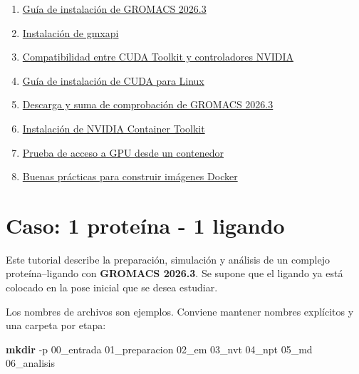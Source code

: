 \documentclass[
  spanish,
  11pt,
  a4paper]{article}
\newenvironment{Shaded}{\begin{snugshade}}{\end{snugshade}}
\newcommand{\AttributeTok}[1]{\textcolor[rgb]{0.13,0.29,0.53}{#1}}
\newcommand{\FunctionTok}[1]{\textcolor[rgb]{0.13,0.29,0.53}{\textbf{#1}}}
\newcommand{\NormalTok}[1]{#1}
\providecommand{\tightlist}{%
  \setlength{\itemsep}{0pt}\setlength{\parskip}{0pt}}
\begin{document}
\begin{enumerate}
\def\labelenumi{\arabic{enumi}.}
\tightlist
\item
  \href{https://manual.gromacs.org/current/install-guide/index.html}{Guía
  de instalación de GROMACS 2026.3}
\item
  \href{https://manual.gromacs.org/current/gmxapi/userguide/install.html}{Instalación
  de gmxapi}
\item
  \href{https://docs.nvidia.com/deploy/cuda-compatibility/minor-version-compatibility.html}{Compatibilidad
  entre CUDA Toolkit y controladores NVIDIA}
\item
  \href{https://docs.nvidia.com/cuda/cuda-installation-guide-linux/}{Guía
  de instalación de CUDA para Linux}
\item
  \href{https://manual.gromacs.org/documentation/2026.3/download.html}{Descarga
  y suma de comprobación de GROMACS 2026.3}
\item
  \href{https://docs.nvidia.com/datacenter/cloud-native/container-toolkit/latest/install-guide.html}{Instalación
  de NVIDIA Container Toolkit}
\item
  \href{https://docs.nvidia.com/datacenter/cloud-native/container-toolkit/latest/sample-workload.html}{Prueba
  de acceso a GPU desde un contenedor}
\item
  \href{https://docs.docker.com/build/building/best-practices/}{Buenas
  prácticas para construir imágenes Docker}
\end{enumerate}

\section{Caso: 1 proteína - 1
ligando}\label{caso-1-proteuxedna---1-ligando}

Este tutorial describe la preparación, simulación y análisis de un
complejo proteína--ligando con \textbf{GROMACS 2026.3}. Se supone que el
ligando ya está colocado en la pose inicial que se desea estudiar.

Los nombres de archivos son ejemplos. Conviene mantener nombres
explícitos y una carpeta por etapa:

\begin{Shaded}
\begin{Highlighting}[]
\FunctionTok{mkdir} \AttributeTok{{-}p}\NormalTok{ 00\_entrada 01\_preparacion 02\_em 03\_nvt 04\_npt 05\_md 06\_analisis}
\end{Highlighting}
\end{Shaded}
\end{document}
